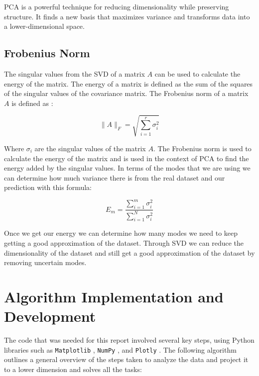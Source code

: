 \documentclass[11pt]{amsart}
\begin{document}
PCA is a powerful technique for reducing dimensionality while preserving structure. It finds a new basis that maximizes variance and transforms data into a lower-dimensional space.

\subsection{Frobenius Norm}


The singular values from the SVD of a matrix $A$ can be used to calculate the energy of the matrix. The energy of a matrix is defined as the sum of the squares of the singular values of the covariance matrix. The Frobenius norm of a matrix $A$ is defined as \cite{wiki_frob}:

\[\|A\|_F = \sqrt{\sum_{i=1}^{r}\sigma_i^2}\]

Where $\sigma_i$ are the singular values of the matrix $A$. The Frobenius norm is used to calculate the energy of the matrix and is used in the context of PCA to find the energy added by the singular values. In terms of the modes that we are using we can determine how much variance there is from the real dataset and our prediction with this formula:

\[E_m = \frac{\sum_{i = 1}^{m} \sigma_i^2}{\sum_{i = 1}^{N} \sigma_i^2}\]

Once we get our energy we can determine how many modes we need to keep getting a good approximation of the dataset. Through SVD we can reduce the dimensionality of the dataset and still get a good approximation of the dataset by removing uncertain modes.

\section{Algorithm Implementation and Development}\label{sec:Algorithm}

The code that was needed for this report involved several key steps, using Python libraries such as \texttt{Matplotlib} \cite{matplotlib}, \texttt{NumPy} \cite{numpy}, and \texttt{Plotly} \cite{plotly}. The following algorithm outlines a general overview of the steps taken to analyze the data and project it to a lower dimension and solves all the tasks:
\end{document}

